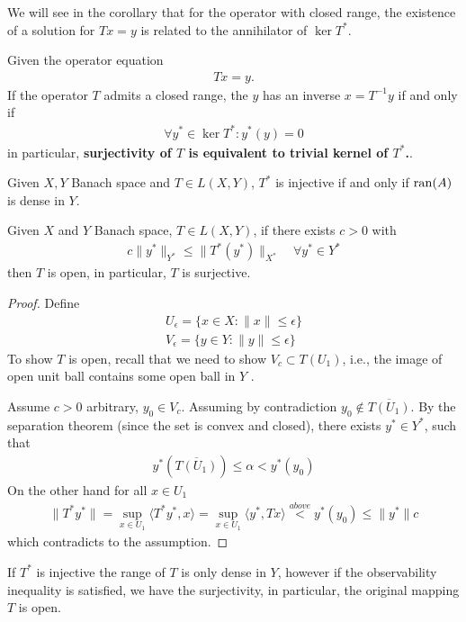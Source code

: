 We will see in the corollary that for the operator with closed range, the existence of a solution for $Tx = y$ is related to the annihilator of $\ker T^*$.
\begin{corollary}
Given the operator equation
\begin{align*}
	Tx = y.
\end{align*}
If the operator $T$ admits a closed range, the $y$ has an inverse $x = T^{-1}y$ if and only if
	\begin{align*}
		\forall y^* \in \ker T^* : y^*(y) = 0
	\end{align*}
	in particular, \textbf{surjectivity of $T$ is equivalent to trivial kernel of $T^*$.}. 
\end{corollary}

\begin{corollary}
	Given $X, Y$ Banach space and $T \in L(X, Y)$, $T^*$ is injective if and only if  $\operatorname{ran}(A)$ is dense in $Y$.
\end{corollary}

\begin{lemma}
	Given $X$ and $Y$ Banach space, $T\in L(X,Y)$, if there exists $c > 0$ with 
	\begin{align*}
		c\|y^*\|_{Y^*} \le \|T^*(y^*)\|_{X^*} \quad \forall y^* \in Y^*
	\end{align*}
	then $T$ is open, in particular, $T$ is surjective. 
\end{lemma}
\begin{proof}
Define
\begin{align*}
	U_\epsilon = \{x \in X: \|x\| \le \epsilon \}\\
	V_\epsilon = \{y \in Y: \|y\| \le \epsilon \}
\end{align*}
	To show $T$ is open, recall that we need to show $V_c \subset T(U_1)$, i.e., the image of open unit ball contains some open ball in $Y$ .\par 
	Assume $c >0$ arbitrary, $y_0 \in V_c$. Assuming by contradiction $y_0 \notin \overline{T(U_1)}$. By the separation theorem (since the set is convex and closed),  there exists $y^* \in Y^*$, such that
	\begin{align*}
		y^*(\overline{T(U_1)}) \le \alpha < y^*(y_0)
	\end{align*}
	On the other hand for all $x \in U_1$ 
	\begin{align*}
		\|T^*y^*\| = \sup_{x \in U_1} \langle T^*y^*, x\rangle = \sup_{x \in U_1} \langle y^*, Tx\rangle  \overset{above}{< } y^*(y_0) \le \|y^*\|c
	\end{align*}
	which contradicts to the assumption.
\end{proof}
\begin{remark}
If $T^*$ is injective the range of $T$ is only dense in $Y$, however if the observability inequality is satisfied, we have the surjectivity, in particular, the original mapping $T$ is open. 	
\end{remark}





